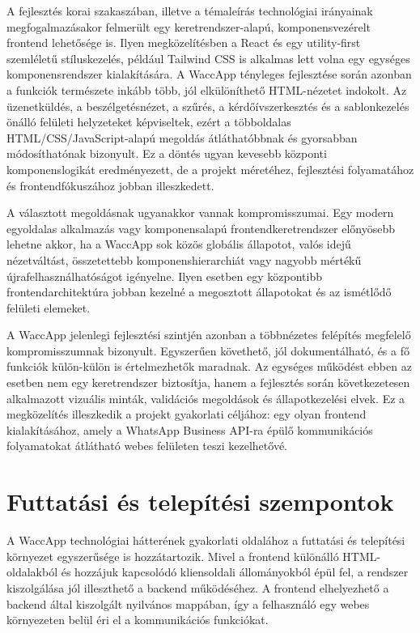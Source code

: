 A fejlesztés korai szakaszában, illetve a témaleírás technológiai irányainak megfogalmazásakor felmerült egy keretrendszer-alapú, komponensvezérelt frontend lehetősége is. Ilyen megközelítésben a React és egy utility-first szemléletű stíluskezelés, például Tailwind CSS is alkalmas lett volna egy egységes komponensrendszer kialakítására. A WaccApp tényleges fejlesztése során azonban a funkciók természete inkább több, jól elkülöníthető HTML-nézetet indokolt. Az üzenetküldés, a beszélgetésnézet, a szűrés, a kérdőívszerkesztés és a sablonkezelés önálló felületi helyzeteket képviseltek, ezért a többoldalas HTML/CSS/JavaScript-alapú megoldás átláthatóbbnak és gyorsabban módosíthatónak bizonyult. Ez a döntés ugyan kevesebb központi komponenslogikát eredményezett, de a projekt méretéhez, fejlesztési folyamatához és frontendfókuszához jobban illeszkedett.

A választott megoldásnak ugyanakkor vannak kompromisszumai. Egy modern egyoldalas alkalmazás vagy komponensalapú frontendkeretrendszer előnyösebb lehetne akkor, ha a WaccApp sok közös globális állapotot, valós idejű nézetváltást, összetettebb komponenshierarchiát vagy nagyobb mértékű újrafelhasználhatóságot igényelne. Ilyen esetben egy központibb frontendarchitektúra jobban kezelné a megosztott állapotokat és az ismétlődő felületi elemeket.

A WaccApp jelenlegi fejlesztési szintjén azonban a többnézetes felépítés megfelelő kompromisszumnak bizonyult. Egyszerűen követhető, jól dokumentálható, és a fő funkciók külön-külön is értelmezhetők maradnak. Az egységes működést ebben az esetben nem egy keretrendszer biztosítja, hanem a fejlesztés során következetesen alkalmazott vizuális minták, validációs megoldások és állapotkezelési elvek. Ez a megközelítés illeszkedik a projekt gyakorlati céljához: egy olyan frontend kialakításához, amely a WhatsApp Business API-ra épülő kommunikációs folyamatokat átlátható webes felületen teszi kezelhetővé.

\section{Futtatási és telepítési szempontok}

A WaccApp technológiai hátterének gyakorlati oldalához a futtatási és telepítési környezet egyszerűsége is hozzátartozik. Mivel a frontend különálló HTML-oldalakból és hozzájuk kapcsolódó kliensoldali állományokból épül fel, a rendszer kiszolgálása jól illeszthető a backend működéséhez. A frontend elhelyezhető a backend által kiszolgált nyilvános mappában, így a felhasználó egy webes környezeten belül éri el a kommunikációs funkciókat.

